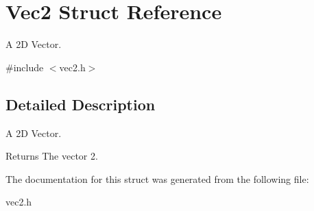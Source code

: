 \hypertarget{struct_vec2}{}\section{Vec2 Struct Reference}
\label{struct_vec2}


A 2\+D Vector.  




{\ttfamily \#include $<$vec2.\+h$>$}



\subsection{Detailed Description}
A 2\+D Vector. 

\begin{DoxyReturn}{Returns}
The vector 2. 
\end{DoxyReturn}


The documentation for this struct was generated from the following file\+:\begin{DoxyCompactItemize}
\item 
vec2.\+h\end{DoxyCompactItemize}
